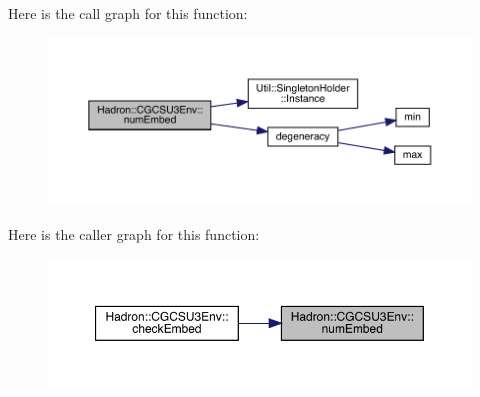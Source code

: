 Here is the call graph for this function\+:\nopagebreak
\begin{figure}[H]
\begin{center}
\leavevmode
\includegraphics[width=350pt]{d4/d47/namespaceHadron_1_1CGCSU3Env_acc35e8f63cd5a1ffe14a963df3f2c1fd_cgraph}
\end{center}
\end{figure}
Here is the caller graph for this function\+:\nopagebreak
\begin{figure}[H]
\begin{center}
\leavevmode
\includegraphics[width=350pt]{d4/d47/namespaceHadron_1_1CGCSU3Env_acc35e8f63cd5a1ffe14a963df3f2c1fd_icgraph}
\end{center}
\end{figure}
